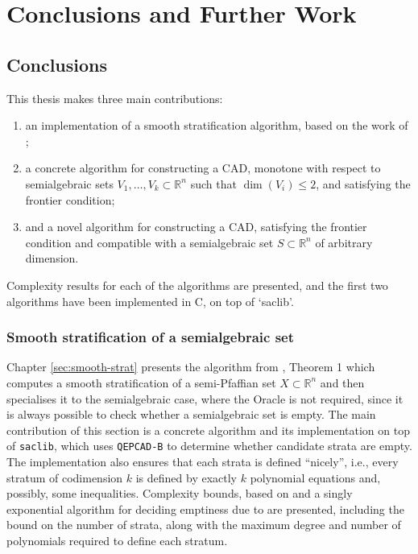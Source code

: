 \documentclass[
]{book}
\providecommand{\tightlist}{%
  \setlength{\itemsep}{0pt}\setlength{\parskip}{0pt}}
\theoremstyle{definition}
\theoremstyle{definition}
\theoremstyle{definition}
\theoremstyle{definition}
\theoremstyle{remark}
\begin{document}
\hypertarget{sec:conclusions}{%
\chapter{Conclusions and Further Work}\label{sec:conclusions}}

\hypertarget{conclusions}{%
\section{Conclusions}\label{conclusions}}

This thesis makes three main contributions:

\begin{enumerate}
\def\labelenumi{\arabic{enumi}.}
\tightlist
\item
  an implementation of a smooth stratification algorithm, based on the work of \citet{gv1995};
\item
  a concrete algorithm for constructing a CAD, monotone with respect to semialgebraic sets \(V_1,\ldots,V_k \subset \mathbb{R}^n\) such that \(\dim(V_i) \le 2\), and satisfying the frontier condition;
\item
  and a novel algorithm for constructing a CAD, satisfying the frontier condition and compatible with a semialgebraic set \(S \subset \mathbb{R}^n\) of arbitrary dimension.
\end{enumerate}

Complexity results for each of the algorithms are presented, and the first two algorithms have been implemented in C, on top of `saclib'.

\hypertarget{smooth-stratification-of-a-semialgebraic-set}{%
\subsection{Smooth stratification of a semialgebraic set}\label{smooth-stratification-of-a-semialgebraic-set}}

Chapter \ref{sec:smooth-strat} presents the algorithm from \citet{gv1995}, Theorem 1 which computes a smooth stratification of a semi-Pfaffian set \(X \subset \mathbb{R}^n\) and then specialises it to the semialgebraic case, where the Oracle is not required, since it is always possible to check whether a semialgebraic set is empty. The main contribution of this section is a concrete algorithm and its implementation on top of \texttt{saclib}, which uses \texttt{QEPCAD-B} to determine whether candidate strata are empty. The implementation also ensures that each strata is defined ``nicely'', i.e., every stratum of codimension \(k\) is defined by exactly \(k\) polynomial equations and, possibly, some inequalities.
Complexity bounds, based on \citet{gv1995} and a singly exponential algorithm for deciding emptiness due to \citet{bpr98} are presented, including the bound on the number of strata, along with the maximum degree and number of polynomials required to define each stratum.
\end{document}
